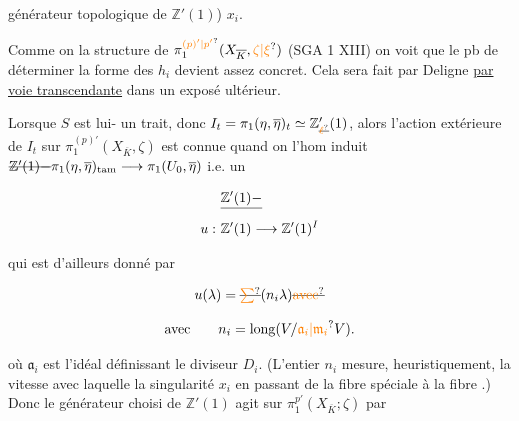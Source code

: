 générateur topologique de $\mathbb Z'(1)$)   $x_i$.

 Comme on  la structure de $\pi_1^{\unsure{(p)'|p'}}(X_{\overline K},\unsure{\zeta|\xi})$  (SGA 1 XIII)  on voit que le pb de déterminer la forme des $h_i$ devient assez concret. Cela  sera fait par Deligne \uline{par voie transcendante} dans un exposé ultérieur.

Lorsque $S$ est lui-\unsure{$=$} un trait, donc  $I_t=\pi_1(\eta,\overline\eta)_t\simeq\mathbb Z'_{\deleted{\unsure{\ell}}}(1)$, alors l'action extérieure de $I_t$ sur $\pi_1^{(p)'}(X_{\overline K},\zeta)$ est connue quand on  l'hom induit $\deleted{\mathbb Z'(1)\mathbin{-}}\pi_1(\eta,\overline\eta)_{\mathrm{tam}}\longrightarrow\pi_1(U_0,\overline\eta)$ i.e. un 

\[
\begin{aligned}
&\deleted{\mathbb Z'(1)\mathbin{-}}\\
u:\ &\mathbb Z'(1)\longrightarrow\mathbb Z'(1)^I
\end{aligned}
\]

 qui est d'ailleurs donné par

\[
u(\lambda)=\deleted{\unsure{\sum}}(n_i\lambda)\deleted{\unsure{\text{avec}}}
\]

\[
\text{avec}\qquad n_i=\operatorname{long}(V/\unsure{\mathfrak a_i|\mathfrak m_i}V).
\]

où $\mathfrak a_i$ est l'idéal définissant le diviseur $D_i$. (L'entier $n_i$ mesure,  heuristiquement, la vitesse avec laquelle  la singularité $x_i$ en passant de la fibre spéciale à la fibre .) Donc le générateur choisi de $\mathbb Z'(1)$ agit  sur $\pi_1^{p'}(X_{\overline K};\zeta)$ par

